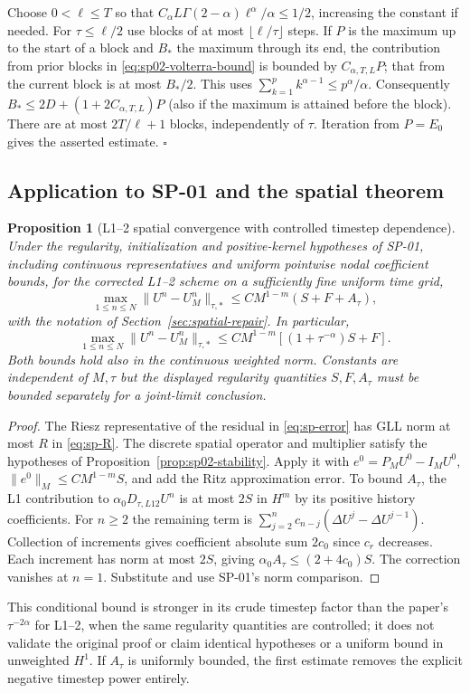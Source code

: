 \documentclass[11pt,a4paper]{amsart}
\theoremstyle{remark}
\theoremstyle{plain}
\newtheorem{proposition}{Proposition}[section]
\theoremstyle{remark}
\numberwithin{equation}{section}
\begin{document}
Choose $0<\ell\le T$ so that $C_\alpha L\Gamma(2-\alpha)\ell^\alpha/\alpha\le 1/2$, increasing the constant if needed. For $\tau\le\ell/2$ use blocks of at most $\lfloor\ell/\tau\rfloor$ steps. If $P$ is the maximum up to the start of a block and $B_*$ the maximum through its end, the contribution from prior blocks in \eqref{eq:sp02-volterra-bound} is bounded by $C_{\alpha,T,L}P$; that from the current block is at most $B_*/2$. This uses $\sum_{k=1}^p k^{\alpha-1}\le p^\alpha/\alpha$. Consequently $B_*\le 2D+(1+2C_{\alpha,T,L})P$ (also if the maximum is attained before the block). There are at most $2T/\ell+1$ blocks, independently of $\tau$. Iteration from $P=E_0$ gives the asserted estimate. \hfill$\square$

\subsection{Application to SP-01 and the spatial theorem}
\begin{proposition}[L1--2 spatial convergence with controlled timestep dependence]\label{prop:sp02-spatial}
Under the regularity, initialization and positive-kernel hypotheses of SP-01, including continuous representatives and uniform pointwise nodal coefficient bounds, for the corrected L1--2 scheme on a sufficiently fine uniform time grid,
\[
 \max_{1\le n\le N}\|U^n-U_M^n\|_{\tau,*}
 \le C M^{1-m}(S+F+A_\tau),
\]
with the notation of Section~\ref{sec:spatial-repair}. In particular,
\[
 \max_{1\le n\le N}\|U^n-U_M^n\|_{\tau,*}
 \le C M^{1-m}[(1+\tau^{-\alpha})S+F].
\]
Both bounds hold also in the continuous weighted norm. Constants are independent of $M,\tau$ but the displayed regularity quantities $S,F,A_\tau$ must be bounded separately for a joint-limit conclusion.
\end{proposition}
\begin{proof}
The Riesz representative of the residual in \eqref{eq:sp-error} has GLL norm at most $R$ in \eqref{eq:sp-R}. The discrete spatial operator and multiplier satisfy the hypotheses of Proposition~\ref{prop:sp02-stability}. Apply it with $e^0=P_MU^0-I_MU^0$, $\|e^0\|_M\le CM^{1-m}S$, and add the Ritz approximation error. To bound $A_\tau$, the L1 contribution to $\alpha_0 D_{\tau,L12}U^n$ is at most $2S$ in $H^m$ by its positive history coefficients. For $n\ge2$ the remaining term is $\sum_{j=2}^nc_{n-j}(\Delta U^j-\Delta U^{j-1})$. Collection of increments gives coefficient absolute sum $2c_0$ since $c_r$ decreases. Each increment has norm at most $2S$, giving $\alpha_0 A_\tau\le(2+4c_0)S$. The correction vanishes at $n=1$. Substitute and use SP-01's norm comparison.
\end{proof}
This conditional bound is stronger in its crude timestep factor than the paper's $\tau^{-2\alpha}$ for L1--2, when the same regularity quantities are controlled; it does not validate the original proof or claim identical hypotheses or a uniform bound in unweighted $H^1$. If $A_\tau$ is uniformly bounded, the first estimate removes the explicit negative timestep power entirely.
\end{document}
